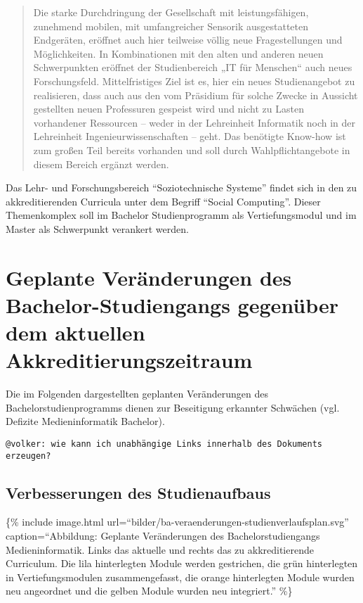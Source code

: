 \begin{quote}
Die starke Durchdringung der Gesellschaft mit leistungsfähigen,
zunehmend mobilen, mit umfangreicher Sensorik ausgestatteten Endgeräten,
eröffnet auch hier teilweise völlig neue Fragestellungen und
Möglichkeiten. In Kombinationen mit den alten und anderen neuen
Schwerpunkten eröffnet der Studienbereich „IT für Menschen`` auch neues
Forschungsfeld. Mittelfristiges Ziel ist es, hier ein neues
Studienangebot zu realisieren, dass auch aus den vom Präsidium für
solche Zwecke in Aussicht gestellten neuen Professuren gespeist wird und
nicht zu Lasten vorhandener Ressourcen -- weder in der Lehreinheit
Informatik noch in der Lehreinheit Ingenieurwissenschaften -- geht. Das
benötigte Know-how ist zum großen Teil bereits vorhanden und soll durch
Wahlpflichtangebote in diesem Bereich ergänzt werden.
\end{quote}

Das Lehr- und Forschungsbereich ``Soziotechnische Systeme'' findet sich
in den zu akkreditierenden Curricula unter dem Begriff ``Social
Computing''. Dieser Themenkomplex soll im Bachelor Studienprogramm als
Vertiefungsmodul und im Master als Schwerpunkt verankert werden.

\section{Geplante Veränderungen des Bachelor-Studiengangs gegenüber
dem aktuellen
Akkreditierungszeitraum}\label{geplante-veruxe4nderungen-des-bachelor-studiengangs-gegenuxfcber-dem-aktuellen-akkreditierungszeitraum}

Die im Folgenden dargestellten geplanten Veränderungen des
Bachelorstudienprogramms dienen zur Beseitigung erkannter Schwächen
(vgl. Defizite Medieninformatik Bachelor).

\begin{verbatim}
@volker: wie kann ich unabhängige Links innerhalb des Dokuments erzeugen?
\end{verbatim}

\subsection{Verbesserungen des
Studienaufbaus}\label{verbesserungen-des-studienaufbaus}

\{\% include image.html
url=``bilder/ba-veraenderungen-studienverlaufsplan.svg''
caption=``Abbildung: Geplante Veränderungen des Bachelorstudiengangs
Medieninformatik. Links das aktuelle und rechts das zu akkreditierende
Curriculum. Die lila hinterlegten Module werden gestrichen, die grün
hinterlegten in Vertiefungsmodulen zusammengefasst, die orange
hinterlegten Module wurden neu angeordnet und die gelben Module wurden
neu integriert.'' \%\}

